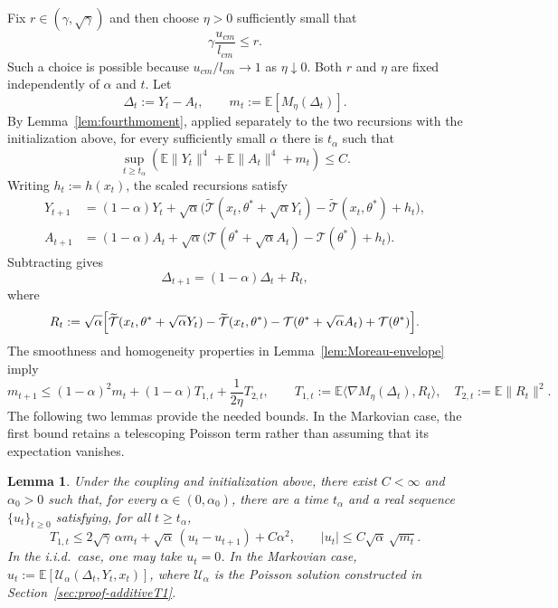\documentclass[11pt,letterpaper]{article}
\theoremstyle{plain}
\newtheorem{lemma}{Lemma}
\theoremstyle{definition}
\theoremstyle{remark}
\newcommand{\E}{\mathbb{E}}
\newcommand{\mT}{\mathcal{T}}
\newcommand{\tmT}{\widetilde{\mT}}
\begin{document}
Fix $r\in(\gamma,\sqrt\gamma)$ and then choose $\eta>0$ sufficiently
small that
\begin{equation}
\label{eq:additive-contraction-margin}
    \gamma\frac{u_{cm}}{l_{cm}}\leq r.
\end{equation}
Such a choice is possible because $u_{cm}/l_{cm}\to1$ as
$\eta\downarrow0$. Both $r$ and $\eta$ are fixed independently of
$\alpha$ and $t$. Let
\[
    \Delta_t:=Y_t-A_t,
    \qquad m_t:=\E[M_\eta(\Delta_t)].
\]
By Lemma~\ref{lem:fourthmoment}, applied separately to the two recursions
with the initialization above, for every sufficiently small $\alpha$
there is $t_\alpha$ such that
\begin{equation}
\label{eq:additive-uniform-moments}
    \sup_{t\geq t_\alpha}
    \left(\E\|Y_t\|^4+\E\|A_t\|^4+m_t\right)\leq C.
\end{equation}
Writing $h_t:=h(x_t)$, the scaled recursions satisfy
\begin{align*}
    Y_{t+1}
    &=(1-\alpha)Y_t+\sqrt\alpha\bigl(
        \tmT(x_t,\theta^*+\sqrt\alpha Y_t)
        -\tmT(x_t,\theta^*)+h_t\bigr),\\
    A_{t+1}
    &=(1-\alpha)A_t+\sqrt\alpha\bigl(
        \mT(\theta^*+\sqrt\alpha A_t)-\mT(\theta^*)+h_t\bigr).
\end{align*}
Subtracting gives
\begin{equation}
\label{eq:additive-delta-recursion}
    \Delta_{t+1}=(1-\alpha)\Delta_t+R_t,
\end{equation}
where
\[
    R_t:=\sqrt\alpha\Bigl[
        \tmT(x_t,\theta^*+\sqrt\alpha Y_t)-\tmT(x_t,\theta^*)
        -\mT(\theta^*+\sqrt\alpha A_t)+\mT(\theta^*)
    \Bigr].
\]
The smoothness and homogeneity properties in
Lemma~\ref{lem:Moreau-envelope} imply
\begin{equation}
\label{eq:maininduction}
    m_{t+1}
    \leq(1-\alpha)^2m_t+(1-\alpha)T_{1,t}
        +\frac{1}{2\eta}T_{2,t},
    \qquad
    T_{1,t}:=\E\langle\nabla M_\eta(\Delta_t),R_t\rangle,
    \quad T_{2,t}:=\E\|R_t\|^2.
\end{equation}
The following two lemmas provide the needed bounds. In the Markovian
case, the first bound retains a telescoping Poisson term rather than
assuming that its expectation vanishes.

\begin{lemma}
\label{lem:additiveT1}
Under the coupling and initialization above, there exist
$C<\infty$ and $\alpha_0>0$ such that, for every
$\alpha\in(0,\alpha_0)$, there are a time $t_\alpha$ and a real sequence
$\{u_t\}_{t\geq0}$ satisfying, for all $t\geq t_\alpha$,
\begin{equation}
\label{eq:additive-T1-bound}
    T_{1,t}
    \leq2\sqrt\gamma\,\alpha m_t
        +\sqrt\alpha\,(u_t-u_{t+1})+C\alpha^2,
    \qquad
    |u_t|\leq C\sqrt\alpha\,\sqrt{m_t}.
\end{equation}
In the i.i.d.\ case, one may take $u_t=0$. In the Markovian case,
$u_t:=\E[\mathcal U_\alpha(\Delta_t,Y_t,x_t)]$, where
$\mathcal U_\alpha$ is the Poisson solution constructed in
Section~\ref{sec:proof-additiveT1}.
\end{lemma}
\end{document}
